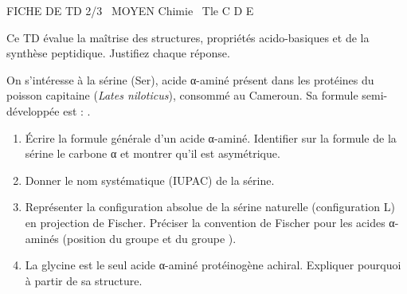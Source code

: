 \documentclass[11pt]{article}
\begin{document}
\begin{tcolorbox}[enhanced,colback=popink,colframe=popink,arc=10pt,boxrule=0pt,left=12pt,right=12pt,top=9pt,bottom=9pt]
{\color{white}\popxbold\small FICHE DE TD 2/3 \textbullet\ MOYEN \hfill Chimie \textbullet\ Tle C D E\par}
\end{tcolorbox}
\vspace{4pt}
Ce TD évalue la maîtrise des structures, propriétés acido-basiques et de la synthèse peptidique. Justifiez chaque réponse.

\begin{exercice}
On s'intéresse à la sérine (Ser), acide α-aminé présent dans les protéines du poisson capitaine (\textit{Lates niloticus}), consommé au Cameroun. Sa formule semi-développée est : .
\begin{enumerate}
    \item Écrire la formule générale d'un acide α-aminé. Identifier sur la formule de la sérine le carbone α et montrer qu'il est asymétrique.
    \item Donner le nom systématique (IUPAC) de la sérine.
    \item Représenter la configuration absolue de la sérine naturelle (configuration L) en projection de Fischer. Préciser la convention de Fischer pour les acides α-aminés (position du groupe  et du groupe ).
    \item La glycine est le seul acide α-aminé protéinogène achiral. Expliquer pourquoi à partir de sa structure.
\end{enumerate}
\end{exercice}
\end{document}
